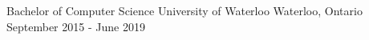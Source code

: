 


\vspace{0.5ex}


\begin{cventries}


\shortcventry                                                                                                                                                                                                                                                                                                                                                                                                                                                                                                                                                                                                                                                                                                                                                                                                                                                                                                                                                                                                                                                                                                                                                                                                                                                                                                                                                                                                                                                                                                                                                                                                                                                                                                                                                                                                                                                                                                                                                                                
{Bachelor of Computer Science} %
{University of Waterloo} %
{Waterloo, Ontario} %
{September 2015 - June 2019 } %


\end{cventries}
